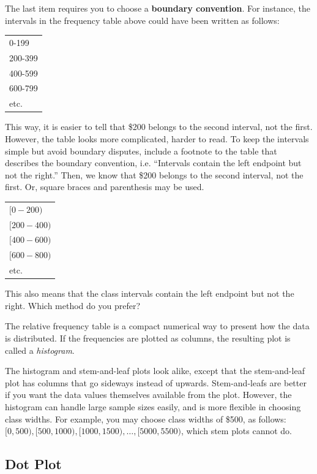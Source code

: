 \documentclass[11pt, chapterprefix=true]{scrbook}\usepackage[]{graphicx}\usepackage[]{color}
\begin{document}
The last item requires you to choose a \textbf{boundary convention}.  For instance, the intervals in the frequency table above could have been written as follows:

\begin{tabular}{@{} l @{}} \hline
0-199 \\
200-399 \\
400-599 \\
600-799 \\
etc. \\ \hline
\end{tabular}

This way, it is easier to tell that \$200 belongs to the second interval, not the first.  However, the table looks more complicated, harder to read.  To keep the intervals simple but avoid boundary disputes, include a footnote to the table that describes the boundary convention, i.e. ``Intervals contain the left endpoint but not the right.''  Then, we know that \$200 belongs to the second interval, not the first.  Or, square braces and parenthesis may be used.

\begin{tabular}{@{} l @{}} \hline
$ [0-200)$ \\
$ [200-400)$ \\
$ [400-600)$ \\
$ [600-800)$ \\
 etc. \\ \hline
\end{tabular}

This also means that the class intervals contain the left endpoint but not the right.  Which method do you prefer?

The relative frequency table is a compact numerical way to present how the data is distributed.  If the frequencies are plotted as columns, the resulting plot is called a \textit{histogram}.

The histogram and stem-and-leaf plots look alike, except that the stem-and-leaf plot has columns that go sideways instead of upwards.  Stem-and-leafs are better if you want the data values themselves available from the plot.  However, the histogram can handle large sample sizes easily, and is more flexible in choosing class widths.  For example, you may choose class widths of \$500, as follows: $[0,500), [500,1000), [1000,1500), \dots, [5000,5500)$, which stem plots cannot do.

\subsection{Dot Plot}
\end{document}
